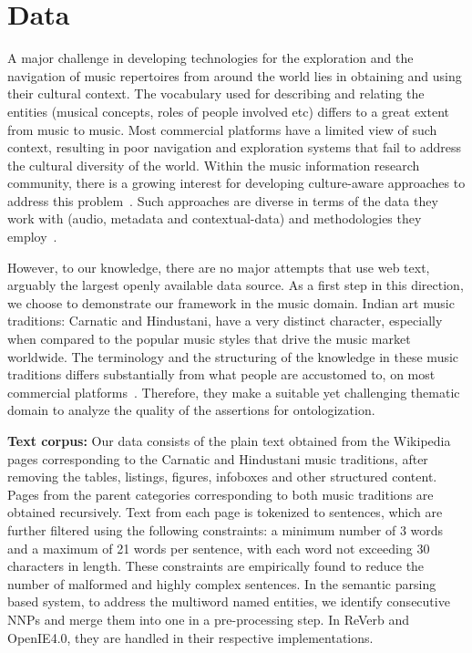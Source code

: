 \documentclass{llncs}
\begin{document}
\section{Data}
\label{sec:data}
A major challenge in developing technologies for the exploration and the navigation of music repertoires from around the world lies in obtaining and using their cultural context. The vocabulary used for describing and relating the entities (musical concepts, roles of people involved etc) differs to a great extent from music to music. Most commercial platforms have a limited view of such context, resulting in poor navigation and exploration systems that fail to address the cultural diversity of the world.  Within the music information research community, there is a growing interest for developing culture-aware approaches to address this problem~\cite{Serra2011}. Such approaches are diverse in terms of the data they work with (audio, metadata and contextual-data) and methodologies they employ~\cite{Serra2013a}. 

However, to our knowledge, there are no major attempts that use web text, arguably the largest openly available data source. As a first step in this direction, we choose to demonstrate our framework in the music domain. Indian art music traditions: Carnatic and Hindustani, have a very distinct character, especially when compared to the popular music styles that drive the music market worldwide. The terminology and the structuring of the knowledge in these music traditions differs substantially from what people are accustomed to, on most commercial platforms~\cite{Krishna2012}. Therefore, they make a suitable yet challenging thematic domain to analyze the quality of the assertions for ontologization.

\medskip
\noindent
\textbf{Text corpus:} Our data consists of the plain text obtained from the Wikipedia pages corresponding to the Carnatic and Hindustani music traditions, after removing the tables, listings, figures, infoboxes and other structured content. Pages from the parent categories corresponding to both music traditions are obtained recursively. Text from each page is tokenized to sentences, which are further filtered using the following constraints: a minimum number of 3 words and a maximum of 21 words per sentence, with each word not exceeding 30 characters in length. These constraints are empirically found to reduce the number of malformed and highly complex sentences. In the semantic parsing based system, to address the multiword named entities, we identify consecutive NNPs and merge them into one in a pre-processing step. In ReVerb and OpenIE4.0, they are handled in their respective implementations.
\end{document}
